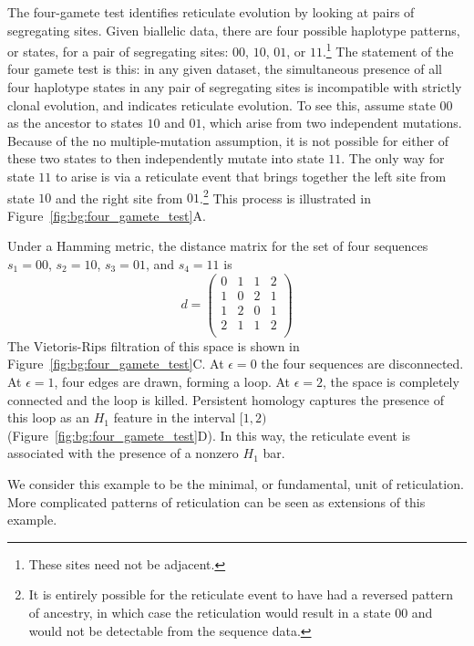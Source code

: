 The four-gamete test identifies reticulate evolution by looking at pairs of segregating sites.
Given biallelic data, there are four possible haplotype patterns, or states, for a pair of segregating sites: $00$, $10$, $01$, or $11$.\footnote{These sites need not be adjacent.}
The statement of the four gamete test is this: in any given dataset, the simultaneous presence of all four haplotype states in any pair of segregating sites is incompatible with strictly clonal evolution, and indicates reticulate evolution.
To see this, assume state $00$ as the ancestor to states $10$ and $01$, which arise from two independent mutations.
Because of the no multiple-mutation assumption, it is not possible for either of these two states to then independently mutate into state $11$.
The only way for state $11$ to arise is via a reticulate event that brings together the left site from state $10$ and the right site from $01$.\footnote{It is entirely possible for the reticulate event to have had a reversed pattern of ancestry, in which case the reticulation would result in a state $00$ and would not be detectable from the sequence data.}
This process is illustrated in Figure~\ref{fig:bg:four_gamete_test}A.

Under a Hamming metric, the distance matrix for the set of four sequences $s_1=00$, $s_2=10$, $s_3=01$, and $s_4=11$ is
\begin{equation}
d = 
\begin{pmatrix}
0 & 1 & 1 & 2 \\
1 & 0 & 2 & 1 \\
1 & 2 & 0 & 1 \\
2 & 1 & 1 & 2 \\
\end{pmatrix}
\end{equation}
The Vietoris-Rips filtration of this space is shown in Figure~\ref{fig:bg:four_gamete_test}C.
At $\epsilon=0$ the four sequences are disconnected.
At $\epsilon=1$, four edges are drawn, forming a loop.
At $\epsilon=2$, the space is completely connected and the loop is killed.
Persistent homology captures the presence of this loop as an $H_1$ feature in the interval $[1,2)$ (Figure~\ref{fig:bg:four_gamete_test}D).
In this way, the reticulate event is associated with the presence of a nonzero $H_1$ bar.

We consider this example to be the minimal, or fundamental, unit of reticulation.
More complicated patterns of reticulation can be seen as extensions of this example.

